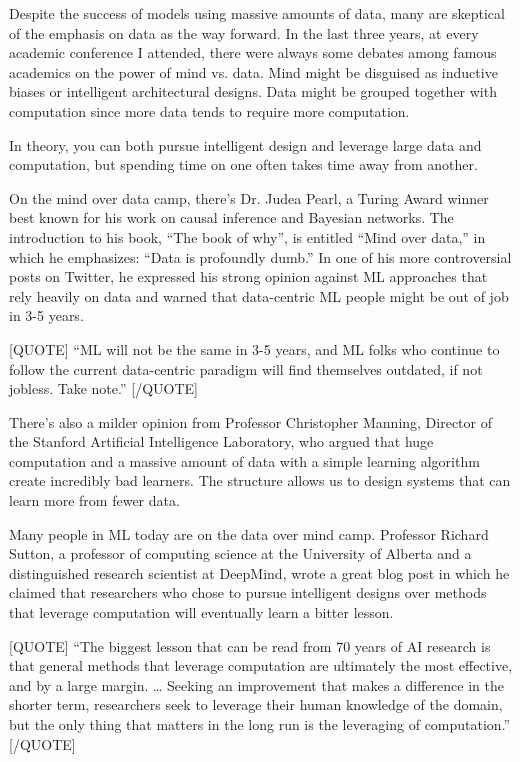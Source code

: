 \documentclass[openany]{book}
\begin{document}
Despite the success of models using massive amounts of data, many are skeptical of the emphasis on data as the way forward. In the last three years, at every academic conference I attended, there were always some debates among famous academics on the power of mind vs. data. Mind might be disguised as inductive biases or intelligent architectural designs. Data might be grouped together with computation since more data tends to require more computation.

In theory, you can both pursue intelligent design and leverage large data and computation, but spending time on one often takes time away from another.

On the mind over data camp, there’s Dr. Judea Pearl, a Turing Award winner best known for his work on causal inference and Bayesian networks. The introduction to his book, “The book of why”, is entitled “Mind over data,” in which he emphasizes: “Data is profoundly dumb.” In one of his more controversial posts on Twitter, he expressed his strong opinion against ML approaches that rely heavily on data and warned that data-centric ML people might be out of job in 3-5 years.

[QUOTE]
“ML will not be the same in 3-5 years, and ML folks who continue to follow the current data-centric paradigm will find themselves outdated, if not jobless. Take note.”
[/QUOTE]

There’s also a milder opinion from Professor Christopher Manning, Director of the Stanford Artificial Intelligence Laboratory, who argued that huge computation and a massive amount of data with a simple learning algorithm create incredibly bad learners. The structure allows us to design systems that can learn more from fewer data.

Many people in ML today are on the data over mind camp. Professor Richard Sutton, a professor of computing science at the University of Alberta and a distinguished research scientist at DeepMind, wrote a great blog post in which he claimed that researchers who chose to pursue intelligent designs over methods that leverage computation will eventually learn a bitter lesson.

[QUOTE]
“The biggest lesson that can be read from 70 years of AI research is that general methods that leverage computation are ultimately the most effective, and by a large margin. … Seeking an improvement that makes a difference in the shorter term, researchers seek to leverage their human knowledge of the domain, but the only thing that matters in the long run is the leveraging of computation.”
[/QUOTE]
\end{document}
